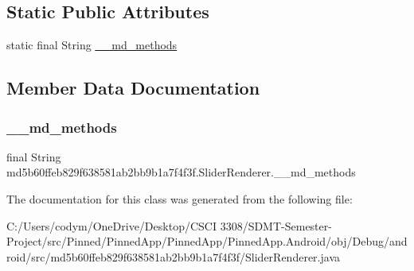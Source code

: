 \subsection*{Static Public Attributes}
\begin{DoxyCompactItemize}
\item 
static final String \hyperlink{classmd5b60ffeb829f638581ab2bb9b1a7f4f3f_1_1_slider_renderer_abd36f56a20d51aa82400faf5b2db4536}{\+\_\+\+\_\+md\+\_\+methods}
\end{DoxyCompactItemize}


\subsection{Member Data Documentation}
\mbox{\label{classmd5b60ffeb829f638581ab2bb9b1a7f4f3f_1_1_slider_renderer_abd36f56a20d51aa82400faf5b2db4536}} 
\subsubsection{\texorpdfstring{\+\_\+\+\_\+md\+\_\+methods}{\_\_md\_methods}}
{\footnotesize\ttfamily final String md5b60ffeb829f638581ab2bb9b1a7f4f3f.\+Slider\+Renderer.\+\_\+\+\_\+md\+\_\+methods\hspace{0.3cm}{\ttfamily [static]}}



The documentation for this class was generated from the following file\+:\begin{DoxyCompactItemize}
\item 
C\+:/\+Users/codym/\+One\+Drive/\+Desktop/\+C\+S\+C\+I 3308/\+S\+D\+M\+T-\/\+Semester-\/\+Project/src/\+Pinned/\+Pinned\+App/\+Pinned\+App/\+Pinned\+App.\+Android/obj/\+Debug/android/src/md5b60ffeb829f638581ab2bb9b1a7f4f3f/Slider\+Renderer.\+java\end{DoxyCompactItemize}
